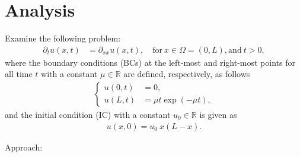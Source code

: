 \documentclass[12pt]{article}
\begin{document}
\section{Analysis}
\begin{example}
	\label{ex:example1}
	Examine the following problem:
	\begin{align}
		\label{eq:probleminh}
		\partial_t u(x,t) & = \partial_{xx} u(x,t), \quad \text{for} \ x \in \Omega = (0,L),\text{and}\ t>0,
	\end{align}
	where the boundary conditions (BCs) at the left-most and right-most points
	for all time $t$
	with a constant $\mu \in \mathbb{R}$ are defined, respectively, as follows
	\begin{align}
		\begin{cases}
			u(0,t) & =0,                                                        \\
			u(L,t) & = \mu t \exp(-\mu t),                                     
		\end{cases}
	\end{align}
	and the initial condition (IC) with a constant $u_{0} \in \mathbb{R}$ is given as 
	\begin{align}
		\label{eq:ICcondition}
		u(x,0) = u_0 \ x(L-x).
	\end{align}
\end{example}
Approach:
\end{document}
